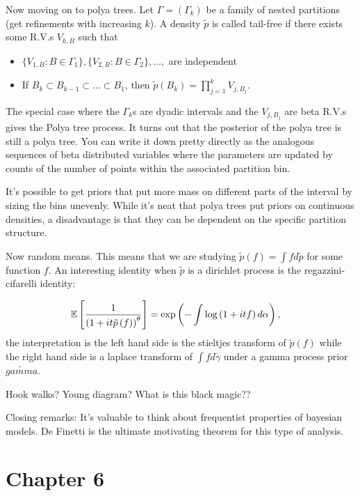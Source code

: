 \documentclass{article}
\begin{document}
Now moving on to polya trees. Let $\Gamma = \left(\Gamma_{k}\right)$ be a family
of nested partitions (get refinements with increasing $k$). A density
$\tilde{p}$ is called tail-free if there exists some R.V.s $V_{k, B}$ such that

\begin{itemize}
\item $\{V_{1, B}: B\in \Gamma_{1}\}, \{V_{2, B} : B \in \Gamma_{2}\}, \dots, $ are independent
\item If $B_{k} \subset B_{k - 1} \subset \dots \subset B_{1}$, then
  $\tilde{p}\left(B_{k}\right) = \prod_{j = 1}^{k} V_{j, B_{j}}$.
\end{itemize}

The special case where the $\Gamma_{k}$s are dyadic intervals and the
$V_{j, B_{j}}$ are beta R.V.s gives the Polya tree process. It turns out that
the posterior of the polya tree is still a polya tree. You can write it down
pretty directly as the analogous sequences of beta distributed variables where
the parameters are updated by counts of the number of points within the
associated partition bin.

It's possible to get priors that put more mass on different parts of the
interval by sizing the bins unevenly. While it's neat that polya trees put
priors on continuous densities, a disadvantage is that they can be dependent on
the specific partition structure.

Now random means. This means that we are studying
$\tilde{p}\left(f\right) = \int f d\tilde{p}$ for some function $f$.
An interesting identity when $\tilde{p}$ is a dirichlet process is the
regazzini-cifarelli identity:

\begin{align}
  \mathbb{E}\left[{\frac{1}{\left(1 + i t \tilde{p}\left(f\right)\right)^{\theta}}}\right] &= \operatorname{exp}\left(-\int \log\left(1 + itf\right) d\alpha\right),
\end{align}
the interpretation is the left hand side is the stieltjes transform of
$\tilde{p}\left(f\right)$ while the right hand side is a laplace transform of
$\int f d\tilde{\gamma}$ under a gamma process prior $\tilde{gamma}$.

Hook walks? Young diagram? What is this black magic??

Closing remarks: It's valuable to think about frequentist properties of bayesian
models. De Finetti is the ultimate motivating theorem for this type of analysis.

\section{Chapter 6}
\label{sec:chapter_6}
\end{document}
